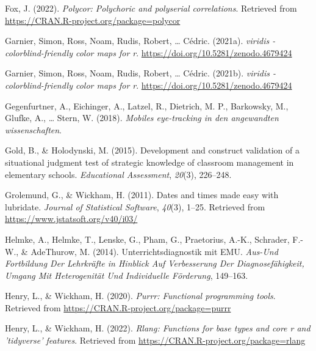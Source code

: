 \documentclass[
  man]{apa6}
\newlength{\cslhangindent}
\newlength{\cslentryspacingunit} %
\newenvironment{CSLReferences}[2] %
 {%
  \setlength{\parindent}{0pt}
  \ifodd #1
  \let\oldpar\par
  \def\par{\hangindent=\cslhangindent\oldpar}
  \fi
  \setlength{\parskip}{#2\cslentryspacingunit}
 }%
 {}
\begin{document}
\begin{CSLReferences}{1}{0}
\leavevmode{}%
Fox, J. (2022). \emph{Polycor: Polychoric and polyserial correlations}. Retrieved from \url{https://CRAN.R-project.org/package=polycor}

\leavevmode{}%
Garnier, Simon, Ross, Noam, Rudis, Robert, \ldots{} Cédric. (2021a). \emph{{viridis} - colorblind-friendly color maps for r}. \url{https://doi.org/10.5281/zenodo.4679424}

\leavevmode{}%
Garnier, Simon, Ross, Noam, Rudis, Robert, \ldots{} Cédric. (2021b). \emph{{viridis} - colorblind-friendly color maps for r}. \url{https://doi.org/10.5281/zenodo.4679424}

\leavevmode{}%
Gegenfurtner, A., Eichinger, A., Latzel, R., Dietrich, M. P., Barkowsky, M., Glufke, A., \ldots{} Stern, W. (2018). \emph{Mobiles eye-tracking in den angewandten wissenschaften}.

\leavevmode{}%
Gold, B., \& Holodynski, M. (2015). Development and construct validation of a situational judgment test of strategic knowledge of classroom management in elementary schools. \emph{Educational Assessment}, \emph{20}(3), 226--248.

\leavevmode{}%
Grolemund, G., \& Wickham, H. (2011). Dates and times made easy with {lubridate}. \emph{Journal of Statistical Software}, \emph{40}(3), 1--25. Retrieved from \url{https://www.jstatsoft.org/v40/i03/}

\leavevmode{}%
Helmke, A., Helmke, T., Lenske, G., Pham, G., Praetorius, A.-K., Schrader, F.-W., \& AdeThurow, M. (2014). Unterrichtsdiagnostik mit EMU. \emph{Aus-Und Fortbildung Der Lehrkr{ä}fte in Hinblick Auf Verbesserung Der Diagnosef{ä}higkeit, Umgang Mit Heterogenit{ä}t Und Individuelle F{ö}rderung}, 149--163.

\leavevmode{}%
Henry, L., \& Wickham, H. (2020). \emph{Purrr: Functional programming tools}. Retrieved from \url{https://CRAN.R-project.org/package=purrr}

\leavevmode{}%
Henry, L., \& Wickham, H. (2022). \emph{Rlang: Functions for base types and core r and 'tidyverse' features}. Retrieved from \url{https://CRAN.R-project.org/package=rlang}


\end{CSLReferences}
\end{document}
